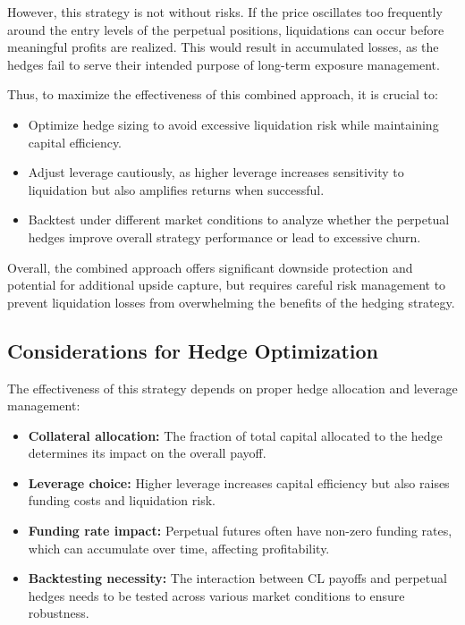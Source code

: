 \documentclass[12pt]{article}
\begin{document}
However, this strategy is not without risks. If the price oscillates too frequently around the entry levels of the perpetual positions, liquidations can occur before meaningful profits are realized. This would result in accumulated losses, as the hedges fail to serve their intended purpose of long-term exposure management. 

\medskip

Thus, to maximize the effectiveness of this combined approach, it is crucial to:
\begin{itemize}
    \item Optimize hedge sizing to avoid excessive liquidation risk while maintaining capital efficiency.
    \item Adjust leverage cautiously, as higher leverage increases sensitivity to liquidation but also amplifies returns when successful.
    \item Backtest under different market conditions to analyze whether the perpetual hedges improve overall strategy performance or lead to excessive churn.
\end{itemize}

Overall, the combined approach offers significant downside protection and potential for additional upside capture, but requires careful risk management to prevent liquidation losses from overwhelming the benefits of the hedging strategy.

\subsection{Considerations for Hedge Optimization}

The effectiveness of this strategy depends on proper hedge allocation and leverage management:
\begin{itemize}
    \item \textbf{Collateral allocation:} The fraction of total capital allocated to the hedge determines its impact on the overall payoff.
    \item \textbf{Leverage choice:} Higher leverage increases capital efficiency but also raises funding costs and liquidation risk.
    \item \textbf{Funding rate impact:} Perpetual futures often have non-zero funding rates, which can accumulate over time, affecting profitability.
    \item \textbf{Backtesting necessity:} The interaction between CL payoffs and perpetual hedges needs to be tested across various market conditions to ensure robustness.
\end{itemize}
\end{document}
